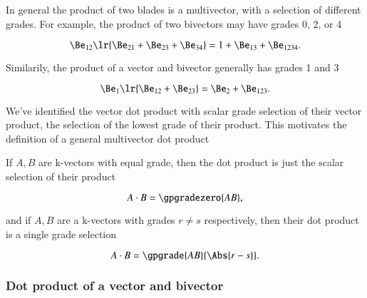 %
%

In general the product of two blades is a multivector, with a selection of different grades.
For example, the product of two bivectors may have grades 0, 2, or 4

\begin{dmath}\label{eqn:generalizedDot:601}
\Be_{12} \lr{ \Be_{21} + \Be_{23} + \Be_{34} }
=
1 + \Be_{13} + \Be_{1234}.
\end{dmath}

Similarily,
the product of a vector and bivector generally has grades 1 and 3

\begin{dmath}\label{eqn:generalizedDot:621}
\Be_1 \lr{ \Be_{12} + \Be_{23} }
=
\Be_2 + \Be_{123}.
\end{dmath}

We've identified the vector dot product with scalar grade selection of their vector product, the selection of the lowest grade of their product.
This motivates the definition of a general multivector dot product


If \( A, B \) are k-vectors with equal grade, then the dot product is just the scalar selection of their product

\begin{dmath}\label{eqn:generalizedDot:580}
A \cdot B = \gpgradezero{ A B },
\end{dmath}

and if \( A, B \) are a k-vectors with grades \( r \ne s \) respectively, then their dot product is a single grade selection

\begin{dmath}\label{eqn:generalizedDot:581}
A \cdot B = \gpgrade{ A B }{\Abs{r - s}}.
\end{dmath}

\subsubsection{Dot product of a vector and bivector}

